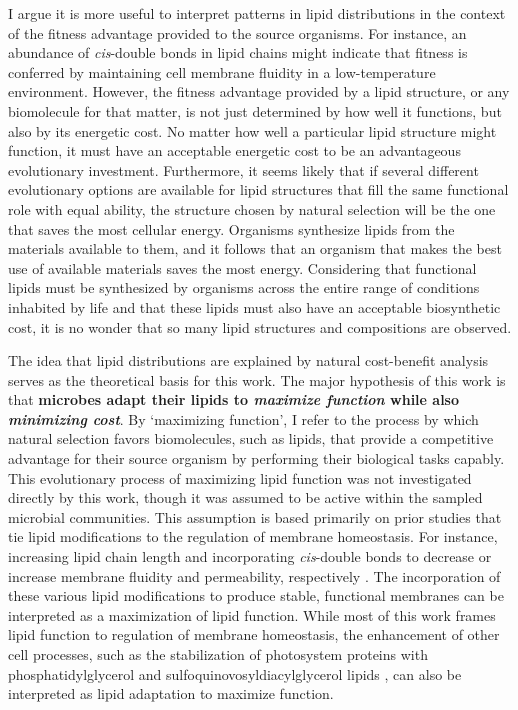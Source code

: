 I argue it is more useful to interpret patterns in lipid distributions in the context of the fitness advantage provided to the source organisms. For instance, an abundance of \textit{cis}-double bonds in lipid chains might indicate that fitness is conferred by maintaining cell membrane fluidity in a low-temperature environment. However, the fitness advantage provided by a lipid structure, or any biomolecule for that matter, is not just determined by how well it functions, but also by its energetic cost. No matter how well a particular lipid structure might function, it must have an acceptable energetic cost to be an advantageous evolutionary investment. Furthermore, it seems likely that if several different evolutionary options are available for lipid structures that fill the same functional role with equal ability, the structure chosen by natural selection will be the one that saves the most cellular energy. Organisms synthesize lipids from the materials available to them, and it follows that an organism that makes the best use of available materials saves the most energy. Considering that functional lipids must be synthesized by organisms across the entire range of conditions inhabited by life and that these lipids must also have an acceptable biosynthetic cost, it is no wonder that so many lipid structures and compositions are observed. 

The idea that lipid distributions are explained by natural cost-benefit analysis serves as the theoretical basis for this work. The major hypothesis of this work is that \textbf{microbes adapt their lipids to \textit{maximize function} while also \textit{minimizing cost}}. By `maximizing function', I refer to the process by which natural selection favors biomolecules, such as lipids, that provide a competitive advantage for their source organism by performing their biological tasks capably. This evolutionary process of maximizing lipid function was not investigated directly by this work, though it was assumed to be active within the sampled microbial communities. This assumption is based primarily on prior studies that tie lipid modifications to the regulation of membrane homeostasis. For instance, increasing lipid chain length and incorporating \textit{cis}-double bonds to decrease or increase membrane fluidity and permeability, respectively \citep[see review by][]{zhang2008membrane}. The incorporation of these various lipid modifications to produce stable, functional membranes can be interpreted as a maximization of lipid function. While most of this work frames lipid function to regulation of membrane homeostasis, the enhancement of other cell processes, such as the stabilization of photosystem proteins with phosphatidylglycerol and sulfoquinovosyldiacylglycerol lipids \citep{sato2004roles}, can also be interpreted as lipid adaptation to maximize function.

